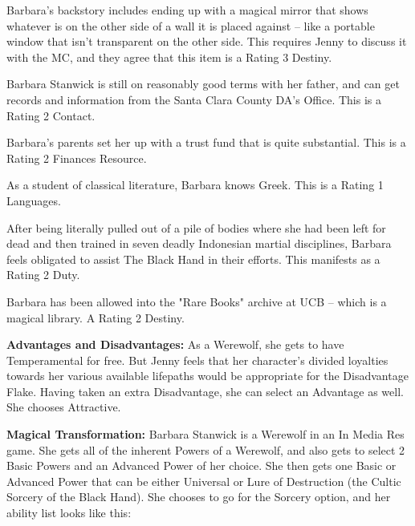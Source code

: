 \begin{itemize*}
\item Barbara's backstory includes ending up with a magical mirror that shows whatever is on the other side of a wall it is placed against -- like a portable window that isn't transparent on the other side. This requires Jenny to discuss it with the MC, and they agree that this item is a Rating 3 Destiny.
\item Barbara Stanwick is still on reasonably good terms with her father, and can get records and information from the Santa Clara County DA's Office. This is a Rating 2 Contact.
\item Barbara's parents set her up with a trust fund that is quite substantial. This is a Rating 2 Finances Resource.
\item As a student of classical literature, Barbara knows Greek. This is a Rating 1 Languages.
\item After being literally pulled out of a pile of bodies where she had been left for dead and then trained in seven deadly Indonesian martial disciplines, Barbara feels obligated to assist The Black Hand in their efforts. This manifests as a Rating 2 Duty.
\item Barbara has been allowed into the "Rare Books" archive at UCB -- which is a magical library. A Rating 2 Destiny.
\end{itemize*}

\textbf{Advantages and Disadvantages:} As a Werewolf, she gets to have Temperamental for free. But Jenny feels that her character's divided loyalties towards her various available lifepaths would be appropriate for the Disadvantage Flake. Having taken an extra Disadvantage, she can select an Advantage as well. She chooses Attractive.

\textbf{Magical Transformation:} Barbara Stanwick is a Werewolf in an In Media Res game. She gets all of the inherent Powers of a Werewolf, and also gets to select 2 Basic Powers and an Advanced Power of her choice. She then gets one Basic or Advanced Power that can be either Universal or Lure of Destruction (the Cultic Sorcery of the Black Hand). She chooses to go for the Sorcery option, and her ability list looks like this:

